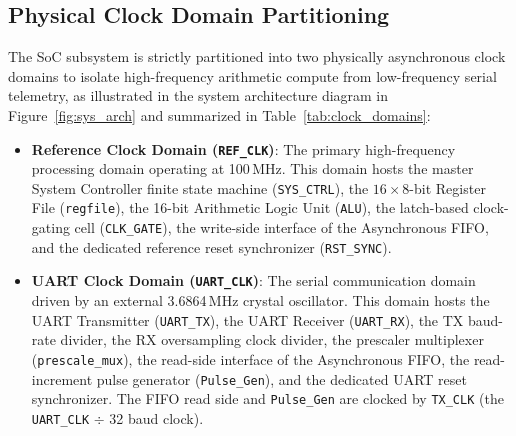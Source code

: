 \documentclass[11pt,a4paper]{article}
\begin{document}
\subsection{Physical Clock Domain Partitioning}
The SoC subsystem is strictly partitioned into two physically asynchronous clock domains to isolate high-frequency arithmetic compute from low-frequency serial telemetry, as illustrated in the system architecture diagram in Figure~\ref{fig:sys_arch} and summarized in Table~\ref{tab:clock_domains}:

\begin{itemize}
    \item \textbf{Reference Clock Domain (\texttt{REF\_CLK})}: The primary high-frequency processing domain operating at 100\,MHz. This domain hosts the master System Controller finite state machine (\texttt{SYS\_CTRL}), the $16\times 8$-bit Register File (\texttt{regfile}), the 16-bit Arithmetic Logic Unit (\texttt{ALU}), the latch-based clock-gating cell (\texttt{CLK\_GATE}), the write-side interface of the Asynchronous FIFO, and the dedicated reference reset synchronizer (\texttt{RST\_SYNC}).
    \item \textbf{UART Clock Domain (\texttt{UART\_CLK})}: The serial communication domain driven by an external 3.6864\,MHz crystal oscillator. This domain hosts the UART Transmitter (\texttt{UART\_TX}), the UART Receiver (\texttt{UART\_RX}), the TX baud-rate divider, the RX oversampling clock divider, the prescaler multiplexer (\texttt{prescale\_mux}), the read-side interface of the Asynchronous FIFO, the read-increment pulse generator (\texttt{Pulse\_Gen}), and the dedicated UART reset synchronizer. The FIFO read side and \texttt{Pulse\_Gen} are clocked by \texttt{TX\_CLK} (the \texttt{UART\_CLK} $\div$ 32 baud clock).
\end{itemize}
\end{document}

